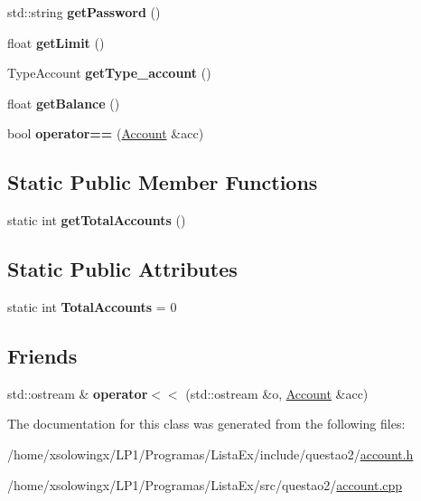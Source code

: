 \begin{DoxyCompactItemize}
std\+::string {\bfseries get\+Password} ()
\item 
\mbox{\label{classAccount_a579bd8d93fa3bcbf78dc9cba275eb269}} 
float {\bfseries get\+Limit} ()
\item 
\mbox{\label{classAccount_a70d66b5495190c8eacff6ff08eee36df}} 
Type\+Account {\bfseries get\+Type\+\_\+account} ()
\item 
\mbox{\label{classAccount_a6a55c17b886dce3a59b18bb746ba4301}} 
float {\bfseries get\+Balance} ()
\item 
\mbox{\label{classAccount_ac285f3e2c3e893cbece0c100cbe49659}} 
bool {\bfseries operator==} (\hyperlink{classAccount}{Account} \&acc)
\end{DoxyCompactItemize}
\subsection*{Static Public Member Functions}
\begin{DoxyCompactItemize}
\item 
\mbox{\label{classAccount_ab709beb9e2fc1233aacb62ffcbcd2144}} 
static int {\bfseries get\+Total\+Accounts} ()
\end{DoxyCompactItemize}
\subsection*{Static Public Attributes}
\begin{DoxyCompactItemize}
\item 
\mbox{\label{classAccount_a302696062a8878a4bd013249dd5bc823}} 
static int {\bfseries Total\+Accounts} = 0
\end{DoxyCompactItemize}
\subsection*{Friends}
\begin{DoxyCompactItemize}
\item 
\mbox{\label{classAccount_ad6ea1ae381a91af7074fbfab1374cd03}} 
std\+::ostream \& {\bfseries operator$<$$<$} (std\+::ostream \&o, \hyperlink{classAccount}{Account} \&acc)
\end{DoxyCompactItemize}


The documentation for this class was generated from the following files\+:\begin{DoxyCompactItemize}
\item 
/home/xsolowingx/\+L\+P1/\+Programas/\+Lista\+Ex/include/questao2/\hyperlink{account_8h}{account.\+h}\item 
/home/xsolowingx/\+L\+P1/\+Programas/\+Lista\+Ex/src/questao2/\hyperlink{account_8cpp}{account.\+cpp}\end{DoxyCompactItemize}
